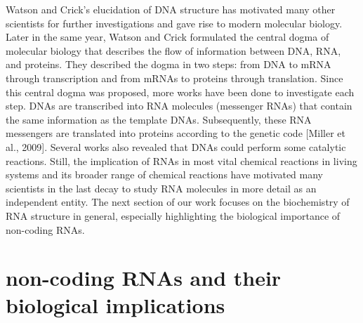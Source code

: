 Watson and Crick's elucidation of DNA structure has motivated many other scientists for further investigations and gave rise to modern molecular biology. Later in the same year, Watson and Crick formulated the central dogma of molecular biology that describes the flow of information between DNA, RNA, and proteins. They described the dogma in two steps: from DNA to mRNA through transcription and from mRNAs to proteins through translation. Since this central dogma was proposed, more works have been done to investigate each step. DNAs are transcribed into RNA molecules (messenger RNAs) that contain the same information as the template DNAs. Subsequently, these RNA messengers are translated into proteins according to the genetic code [Miller et al., 2009]. 
Several works also revealed that DNAs could perform some catalytic reactions. Still, the implication of RNAs in most vital chemical reactions in living systems and its broader range of chemical reactions have motivated many scientists in the last decay to study RNA molecules in more detail as an independent entity. The next section of our work focuses on the biochemistry of RNA structure in general, especially highlighting the biological importance of non-coding RNAs. 

\section{non-coding RNAs and their biological implications} 

